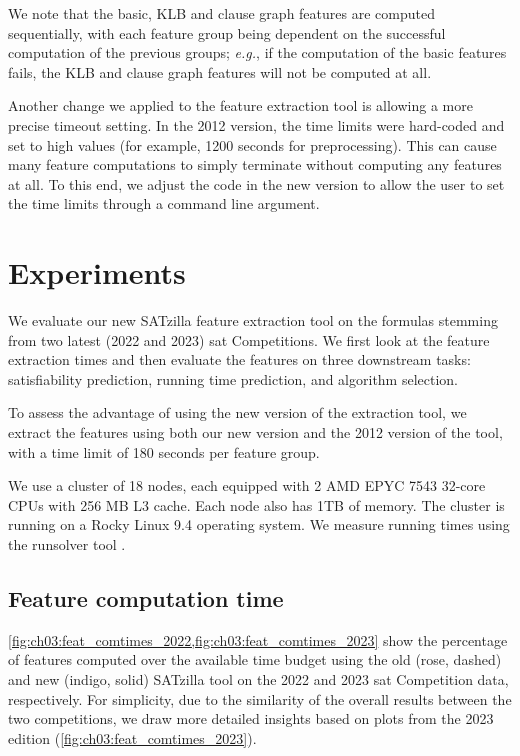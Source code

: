 We note that the basic, KLB and clause graph features are computed sequentially, with each feature group being dependent on the successful computation of the previous groups; \emph{e.g.}, if the computation of the basic features fails, the KLB and clause graph features will not be computed at all.

Another change we applied to the feature extraction tool is allowing a more precise timeout setting. In the 2012 version, the time limits were hard-coded and set to high values (for example, 1200 seconds for preprocessing). This can cause many feature computations to simply terminate without computing any features at all. To this end, we adjust the code in the new version to allow the user to set the time limits through a command line argument.

\section{Experiments}
\label{sec:ch03:experiments}
We evaluate our new SATzilla feature extraction tool on the formulas stemming from two latest (2022 and 2023) \gls{sat} Competitions. We first look at the feature extraction times and then evaluate the features on three downstream tasks: satisfiability prediction, running time prediction, and algorithm selection.

To assess the advantage of using the new version of the extraction tool, we extract the features using both our new version and the 2012 version of the tool, with a time limit of 180 seconds per feature group. 

We use a cluster of 18 nodes, each equipped with 2 AMD EPYC 7543 32-core CPUs with 256 MB L3 cache. Each node also has 1TB of memory. The cluster is running on a Rocky Linux 9.4 operating system. We measure running times using the runsolver tool \cite{Roussel11c}.

\subsection{Feature computation time}
\label{sec:ch03:feature-computation-time}

\cref{fig:ch03:feat_comtimes_2022,fig:ch03:feat_comtimes_2023} show the percentage of features computed over the available time budget using the old (rose, dashed) and new (indigo, solid) SATzilla tool on the 2022 and 2023 \gls{sat} Competition data, respectively. For simplicity, due to the similarity of the overall results between the two competitions, we draw more detailed insights based on plots from the 2023 edition (\cref{fig:ch03:feat_comtimes_2023}).


